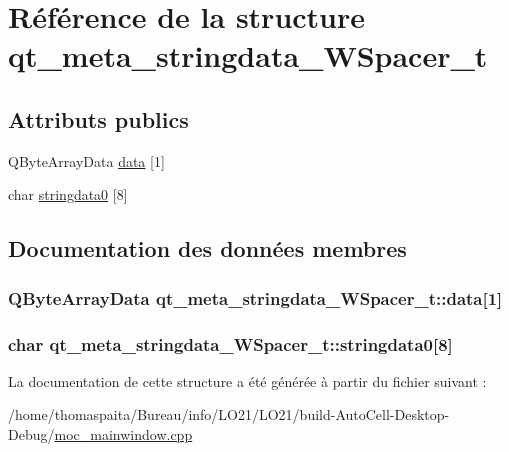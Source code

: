 \hypertarget{structqt__meta__stringdata___w_spacer__t}{}\section{Référence de la structure qt\+\_\+meta\+\_\+stringdata\+\_\+\+W\+Spacer\+\_\+t}
\label{structqt__meta__stringdata___w_spacer__t}
\subsection*{Attributs publics}
\begin{DoxyCompactItemize}
\item 
Q\+Byte\+Array\+Data \hyperlink{structqt__meta__stringdata___w_spacer__t_a31ba163e897c2e33b35ac19722058fa0}{data} \mbox{[}1\mbox{]}
\item 
char \hyperlink{structqt__meta__stringdata___w_spacer__t_a6aa496e58add48e1d6dc9b3b615aa03d}{stringdata0} \mbox{[}8\mbox{]}
\end{DoxyCompactItemize}


\subsection{Documentation des données membres}
\subsubsection[{\texorpdfstring{data}{data}}]{\setlength{\rightskip}{0pt plus 5cm}Q\+Byte\+Array\+Data qt\+\_\+meta\+\_\+stringdata\+\_\+\+W\+Spacer\+\_\+t\+::data\mbox{[}1\mbox{]}}\hypertarget{structqt__meta__stringdata___w_spacer__t_a31ba163e897c2e33b35ac19722058fa0}{}\label{structqt__meta__stringdata___w_spacer__t_a31ba163e897c2e33b35ac19722058fa0}
\subsubsection[{\texorpdfstring{stringdata0}{stringdata0}}]{\setlength{\rightskip}{0pt plus 5cm}char qt\+\_\+meta\+\_\+stringdata\+\_\+\+W\+Spacer\+\_\+t\+::stringdata0\mbox{[}8\mbox{]}}\hypertarget{structqt__meta__stringdata___w_spacer__t_a6aa496e58add48e1d6dc9b3b615aa03d}{}\label{structqt__meta__stringdata___w_spacer__t_a6aa496e58add48e1d6dc9b3b615aa03d}


La documentation de cette structure a été générée à partir du fichier suivant \+:\begin{DoxyCompactItemize}
\item 
/home/thomaspaita/\+Bureau/info/\+L\+O21/\+L\+O21/build-\/\+Auto\+Cell-\/\+Desktop-\/\+Debug/\hyperlink{moc__mainwindow_8cpp}{moc\+\_\+mainwindow.\+cpp}\end{DoxyCompactItemize}
